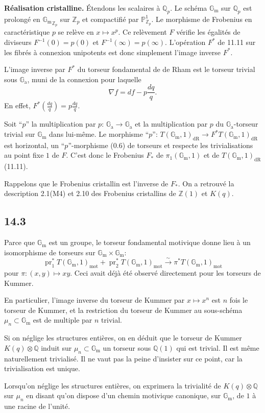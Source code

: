 \documentclass[12pt,a4paper]{article}
\theoremstyle{plain}
\theoremstyle{definition}
\theoremstyle{remark}
\DeclareMathOperator{\pr}{pr}
\newcommand*{\Gm}{\mathbb{G}_\mathrm{m}}
\newcommand{\Ga}{\mathbb{G}_\mathrm{a}}
\newcommand{\bZ}{\mathbb{Z}}
\newcommand{\bQ}{\mathbb{Q}}
\newcommand{\bP}{\mathbb{P}}
\newcommand{\dr}{\mathrm{dR}}
\newcommand{\mot}{\mathrm{mot}}
\begin{document}
\textbf{Réalisation cristalline.} Étendons les scalaires à $\bQ_p$. Le schéma $\Gm$ sur $\bQ_p$ est prolongé en ${\Gm}_{\bZ_p}$ sur $\bZ_p$ et compactifié par $\bP^1_{\bZ_p}$. Le morphisme de Frobenius en caractéristique $p$ se relève en $x \mapsto x^p$. Ce relèvement $F$ vérifie les égalités de diviseurs $F^{-1}(0) = p(0)$ et $F^{-1}(\infty) = p(\infty)$. L'opération $F^*$ de 11.11 sur les fibrés à connexion unipotents est donc simplement l'image inverse $F^*$.

L'image inverse par $F^*$ du torseur fondamental de de Rham est le torseur trivial sous $\Ga$, muni de la connexion pour laquelle
\[
\nabla f = df - p \frac{dq}{q}.
\]
En effet, $F^*(\frac{dq}{q}) = p \frac{dq}{q}$.

Soit ``$p$'' la multiplication par $p$: $\Ga \to \Ga$ et la multiplication par $p$ du $\Ga$-torseur trivial sur $\Gm$ dans lui-même. Le morphisme ``$p$'': $T(\Gm, 1)_{\dr} \to F^* T(\Gm, 1)_{\dr}$ est horizontal, un ``$p$''-morphisme (0.6) de torseurs et respecte les trivialisations au point fixe $1$ de $F$. C'est donc le Frobenius $F_*$ de $\pi_1(\Gm, 1)$ et de $T(\Gm, 1)_{\dr}$ (11.11).

Rappelons que le Frobenius cristallin est l'inverse de $F_*$. On a retrouvé la description 2.1(M4) et 2.10 des Frobenius cristallins de $\bZ(1)$ et $K(q)$.

\subsection*{14.3}

Parce que $\Gm$ est un groupe, le torseur fondamental motivique donne lieu à un isomorphisme de torseurs sur $\Gm \times \Gm$:
\[
\pr_1^* T(\Gm, 1)_{\mot} + \pr_2^* T(\Gm, 1)_{\mot} \xrightarrow{\sim} \pi^* T(\Gm, 1)_{\mot}
\]
pour $\pi : (x,y) \mapsto xy$. Ceci avait déjà été observé directement pour les torseurs de Kummer.

En particulier, l'image inverse du torseur de Kummer par $x \mapsto x^n$ est $n$ fois le torseur de Kummer, et la restriction du torseur de Kummer au sous-schéma $\mu_n \subset \Gm$ est de multiple par $n$ trivial.

Si on néglige les structures entières, on en déduit que le torseur de Kummer $K(q) \otimes \bQ$ induit sur $\mu_n \subset \Gm$ un torseur sous $\bQ(1)$ qui est trivial. Il est même naturellement trivialisé. Il ne vaut pas la peine d'insister sur ce point, car la trivialisation est unique.

Lorsqu'on néglige les structures entières, on exprimera la trivialité de $K(q) \otimes \bQ$ sur $\mu_n$ en disant qu'on dispose d'un chemin motivique canonique, sur $\Gm$, de $1$ à une racine de l'unité.
\end{document}
